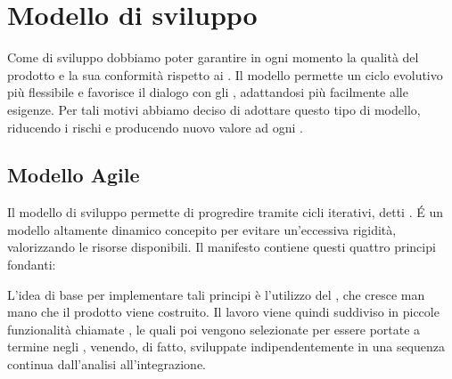 	\section{Modello di sviluppo}
Come  di sviluppo dobbiamo poter garantire in ogni momento la qualità del prodotto  e la sua conformità rispetto ai . \newline
Il modello  permette un ciclo evolutivo più flessibile e favorisce il dialogo con gli , adattandosi più facilmente alle esigenze. \newline 
Per tali motivi abbiamo deciso di adottare questo tipo di modello, riducendo i rischi e producendo nuovo valore ad ogni .

\subsection{Modello Agile}
Il modello di sviluppo  permette di progredire tramite cicli iterativi, detti .
É un modello altamente dinamico concepito per evitare un'eccessiva rigidità, valorizzando le risorse disponibili. \newline
Il manifesto  contiene questi quattro principi fondanti:

L’idea di base per implementare tali principi è l’utilizzo del \textbf{}, che cresce man mano che il prodotto viene costruito. \newline
Il lavoro viene quindi suddiviso in piccole funzionalità chiamate \textbf{}, le quali poi vengono selezionate per essere portate a termine negli \textbf{}, venendo, di fatto, sviluppate indipendentemente in una sequenza continua dall’analisi all’integrazione. \newline

